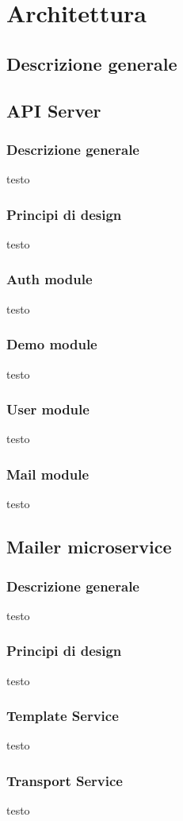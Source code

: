\chapter{Architettura}
\section{Descrizione generale}

\section{API Server}
\subsection{Descrizione generale}
testo
\subsection{Principi di design}
testo
\subsection{Auth module}
testo
\subsection{Demo module}
testo
\subsection{User module}
testo
\subsection{Mail module}
testo

\section{Mailer microservice}
\subsection{Descrizione generale}
testo
\subsection{Principi di design}
testo
\subsection{Template Service}
testo
\subsection{Transport Service}
testo


